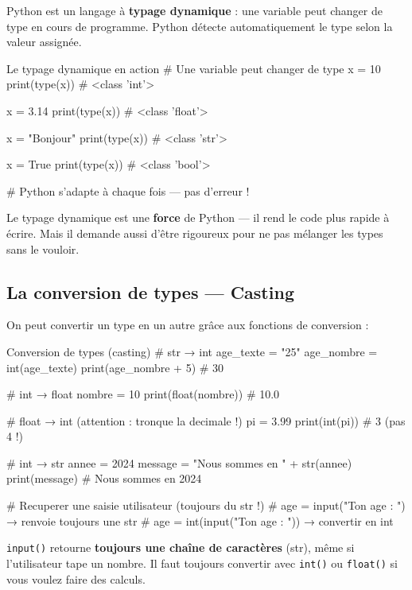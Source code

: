 \documentclass[12pt, a4paper]{article}
\begin{document}
Python est un langage à \textbf{typage dynamique} : une variable peut changer de type en cours de programme. Python détecte automatiquement le type selon la valeur assignée.

\begin{codeblock}{Le typage dynamique en action}
# Une variable peut changer de type
x = 10
print(type(x))   # <class 'int'>

x = 3.14
print(type(x))   # <class 'float'>

x = "Bonjour"
print(type(x))   # <class 'str'>

x = True
print(type(x))   # <class 'bool'>

# Python s'adapte à chaque fois — pas d'erreur !
\end{codeblock}

\begin{boiteNote}
Le typage dynamique est une \textbf{force} de Python — il rend le code plus rapide à écrire. Mais il demande aussi d'être rigoureux pour ne pas mélanger les types sans le vouloir.
\end{boiteNote}

\subsection{La conversion de types — Casting}

On peut convertir un type en un autre grâce aux fonctions de conversion :

\begin{codeblock}{Conversion de types (casting)}
# str → int
age_texte = "25"
age_nombre = int(age_texte)
print(age_nombre + 5)   # 30

# int → float
nombre = 10
print(float(nombre))    # 10.0

# float → int (attention : tronque la decimale !)
pi = 3.99
print(int(pi))          # 3  (pas 4 !)

# int → str
annee = 2024
message = "Nous sommes en " + str(annee)
print(message)          # Nous sommes en 2024

# Recuperer une saisie utilisateur (toujours du str !)
# age = input("Ton age : ")    → renvoie toujours une str
# age = int(input("Ton age : ")) → convertir en int
\end{codeblock}

\begin{boiteErreur}
\texttt{input()} retourne \textbf{toujours une chaîne de caractères} (str), même si l'utilisateur tape un nombre.
Il faut toujours convertir avec \texttt{int()} ou \texttt{float()} si vous voulez faire des calculs.
\end{boiteErreur}
\end{document}
